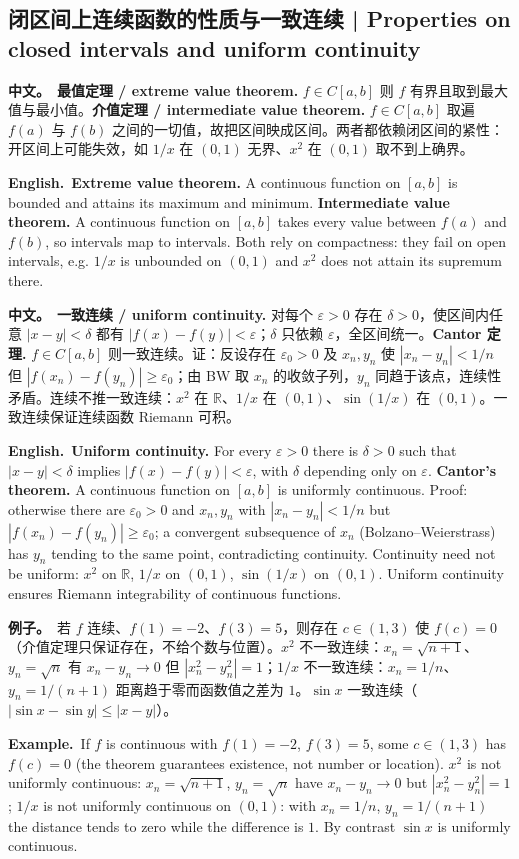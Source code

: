 \documentclass[UTF8,11pt,a4paper]{ctexart}
\newcommand{\R}{\mathbb{R}}
\newcommand{\BOTH}[2]{\par\noindent\textbf{中文。}\ #1\par\noindent\textbf{English.}\ #2\par}
\newcommand{\EX}[2]{\par\noindent\textbf{例子。}\ #1\par\noindent\textbf{Example.}\ #2\par}
\begin{document}
\subsection{闭区间上连续函数的性质与一致连续 | Properties on closed intervals and uniform continuity}
\BOTH{\textbf{最值定理 / extreme value theorem.} $f\in C[a,b]$ 则 $f$ 有界且取到最大值与最小值。\textbf{介值定理 / intermediate value theorem.} $f\in C[a,b]$ 取遍 $f(a)$ 与 $f(b)$ 之间的一切值，故把区间映成区间。两者都依赖闭区间的紧性：开区间上可能失效，如 $1/x$ 在 $(0,1)$ 无界、$x^2$ 在 $(0,1)$ 取不到上确界。}{\textbf{Extreme value theorem.} A continuous function on $[a,b]$ is bounded and attains its maximum and minimum. \textbf{Intermediate value theorem.} A continuous function on $[a,b]$ takes every value between $f(a)$ and $f(b)$, so intervals map to intervals. Both rely on compactness: they fail on open intervals, e.g. $1/x$ is unbounded on $(0,1)$ and $x^2$ does not attain its supremum there.}
\BOTH{\textbf{一致连续 / uniform continuity.} 对每个 $\varepsilon>0$ 存在 $\delta>0$，使区间内任意 $|x-y|<\delta$ 都有 $|f(x)-f(y)|<\varepsilon$；$\delta$ 只依赖 $\varepsilon$，全区间统一。\textbf{Cantor 定理.} $f\in C[a,b]$ 则一致连续。证：反设存在 $\varepsilon_0>0$ 及 $x_n,y_n$ 使 $|x_n-y_n|<1/n$ 但 $|f(x_n)-f(y_n)|\ge\varepsilon_0$；由 BW 取 $x_n$ 的收敛子列，$y_n$ 同趋于该点，连续性矛盾。连续不推一致连续：$x^2$ 在 $\R$、$1/x$ 在 $(0,1)$、$\sin(1/x)$ 在 $(0,1)$。一致连续保证连续函数 Riemann 可积。}{\textbf{Uniform continuity.} For every $\varepsilon>0$ there is $\delta>0$ such that $|x-y|<\delta$ implies $|f(x)-f(y)|<\varepsilon$, with $\delta$ depending only on $\varepsilon$. \textbf{Cantor's theorem.} A continuous function on $[a,b]$ is uniformly continuous. Proof: otherwise there are $\varepsilon_0>0$ and $x_n,y_n$ with $|x_n-y_n|<1/n$ but $|f(x_n)-f(y_n)|\ge\varepsilon_0$; a convergent subsequence of $x_n$ (Bolzano--Weierstrass) has $y_n$ tending to the same point, contradicting continuity. Continuity need not be uniform: $x^2$ on $\R$, $1/x$ on $(0,1)$, $\sin(1/x)$ on $(0,1)$. Uniform continuity ensures Riemann integrability of continuous functions.}
\EX{若 $f$ 连续、$f(1)=-2$、$f(3)=5$，则存在 $c\in(1,3)$ 使 $f(c)=0$（介值定理只保证存在，不给个数与位置）。$x^2$ 不一致连续：$x_n=\sqrt{n+1}$、$y_n=\sqrt n$ 有 $x_n-y_n\to0$ 但 $|x_n^2-y_n^2|=1$；$1/x$ 不一致连续：$x_n=1/n$、$y_n=1/(n+1)$ 距离趋于零而函数值之差为 $1$。$\sin x$ 一致连续（$|\sin x-\sin y|\le|x-y|$）。}{If $f$ is continuous with $f(1)=-2$, $f(3)=5$, some $c\in(1,3)$ has $f(c)=0$ (the theorem guarantees existence, not number or location). $x^2$ is not uniformly continuous: $x_n=\sqrt{n+1}$, $y_n=\sqrt n$ have $x_n-y_n\to0$ but $|x_n^2-y_n^2|=1$; $1/x$ is not uniformly continuous on $(0,1)$: with $x_n=1/n$, $y_n=1/(n+1)$ the distance tends to zero while the difference is $1$. By contrast $\sin x$ is uniformly continuous.}
\end{document}
